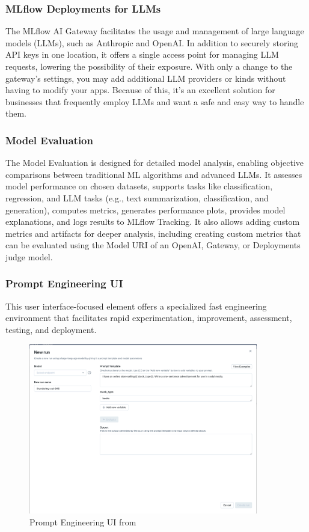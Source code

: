         \subsubsection{MLflow Deployments for LLMs}
        The MLflow AI Gateway facilitates the usage and management of large language models (LLMs), such as Anthropic and OpenAI.  In addition to securely storing API keys in one location, it offers a single access point for managing LLM requests, lowering the possibility of their exposure.  With only a change to the gateway's settings, you may add additional LLM providers or kinds without having to modify your apps.  Because of this, it's an excellent solution for businesses that frequently employ LLMs and want a safe and easy way to handle them.
        \subsubsection{Model Evaluation}
        The Model Evaluation is designed for detailed model analysis, enabling objective comparisons between traditional ML algorithms and advanced LLMs. It assesses model performance on chosen datasets, supports tasks like classification, regression, and LLM tasks (e.g., text summarization, classification, and generation), computes metrics, generates performance plots, provides model explanations, and logs results to MLflow Tracking. It also allows adding custom metrics and artifacts for deeper analysis, including creating custom metrics that can be evaluated using the Model URI of an OpenAI, Gateway, or Deployments judge model.
        \subsubsection{Prompt Engineering UI}
        This user interface-focused element offers a specialized fast engineering environment that facilitates rapid experimentation, improvement, assessment, testing, and deployment.
        \begin{figure}[H]
            \centering
            \includegraphics[width=10cm]{chapters/2/figures/prompt_modal_1-51ecbda29dcb90d4b7ed59a996470b87.png}
            \caption[Prompt Engineering UI]{Prompt Engineering UI  from~\cite{mlflow}}
            \label{fig:mlflow-prompt-engineering-ui}
        \end{figure}
